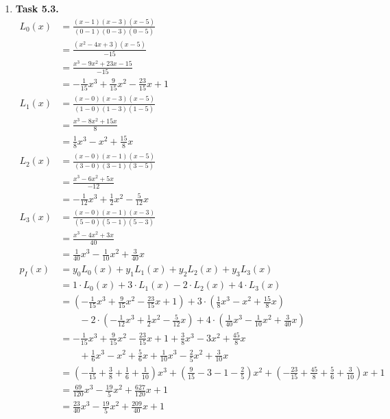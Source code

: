 \documentclass[a4paper,11pt]{article}
\begin{document}
\begin {enumerate}
	\item[\textbf{Task 5.3.}]
		\begin{align*}
			L_0(x) &= \frac{(x-1)(x-3)(x-5)}{(0-1)(0-3)(0-5)}\\
					&= \frac{(x^2 - 4x + 3)(x-5)}{-15}\\
					&= \frac{x^3 - 9x^2 + 23x -15}{-15}\\
					&= - \frac{1}{15} x^3 + \frac{9}{15} x^2 - \frac{23}{15} x + 1\\
			L_1(x) &= \frac{(x-0)(x-3)(x-5)}{(1-0)(1-3)(1-5)}\\
					&= \frac{x^3 - 8x^2 + 15x}{8}\\
					&= \frac{1}{8} x^3 - x^2 + \frac{15}{8} x\\
			L_2(x) &= \frac{(x-0)(x-1)(x-5)}{(3-0)(3-1)(3-5)}\\
					&= \frac{x^3 - 6x^2 + 5x}{-12}\\
					&= -\frac{1}{12} x^3 + \frac{1}{2} x^2 - \frac{5}{12} x\\
			L_3(x) &= \frac{(x-0)(x-1)(x-3)}{(5-0)(5-1)(5-3)}\\
					&= \frac{x^3 - 4x^2 + 3x}{40}\\
					&= \frac{1}{40} x^3 - \frac{1}{10} x^2 + \frac{3}{40} x\\
			p_I(x) &= y_0 L_0(x) + y_1 L_1(x) + y_2 L_2(x) + y_3 L_3(x)\\
					&= 1 \cdot L_0(x) + 3 \cdot L_1(x) - 2 \cdot L_2(x) + 4 \cdot L_3(x)\\
					&= \left(- \frac{1}{15} x^3 + \frac{9}{15} x^2 - \frac{23}{15} x + 1 \right) + 3 \cdot \left(\frac{1}{8} x^3 - x^2 + \frac{15}{8} x\right)\\
					&\qquad - 2 \cdot \left(-\frac{1}{12} x^3 + \frac{1}{2} x^2 - \frac{5}{12} x \right) + 4 \cdot \left(\frac{1}{40} x^3 - \frac{1}{10} x^2 + \frac{3}{40} x \right)\\
					&= - \frac{1}{15} x^3 + \frac{9}{15} x^2 - \frac{23}{15} x + 1 + \frac{3}{8} x^3 - 3x^2 + \frac{45}{8} x\\
					&\qquad + \frac{1}{6} x^3 - x^2 + \frac{5}{6} x + \frac{1}{10} x^3 - \frac{2}{5} x^2 + \frac{3}{10} x\\
					&= \left( -\frac{1}{15} + \frac{3}{8} + \frac{1}{6} + \frac{1}{10} \right) x^3 + \left( \frac{9}{15} - 3 - 1 - \frac{2}{5} \right) x^2 + \left( -\frac{23}{15} + \frac{45}{8} + \frac{5}{6} + \frac{3}{10} \right) x + 1 \\
					&= \frac{69}{120} x^3 -\frac{19}{5} x^2 + \frac{627}{120} x + 1 \\
					&= \frac{23}{40} x^3 -\frac{19}{5} x^2 + \frac{209}{40} x + 1\\
		\end{align*}
	

\end{enumerate}
\end{document}
